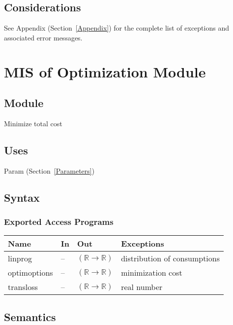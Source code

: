 \documentclass[12pt, titlepage]{article}
\begin{document}
 
 \subsection{Considerations}

See Appendix (Section~\ref{Appendix}) for the complete list of exceptions and
 associated error messages.

\newpage
\section{MIS of Optimization Module} \label{Temperature}

\subsection{Module}

Minimize total cost

\subsection{Uses}

Param (Section~\ref{Parameters})

\subsection{Syntax}

\subsubsection{Exported Access Programs}

\begin{center}
\begin{tabular}{p{3.5cm} p{1cm} p{7cm} p{2cm}}
\hline
\textbf{Name} & \textbf{In} & \textbf{Out} & \textbf{Exceptions} \\
\hline
linprog & -- & $(\mathbb{R} \rightarrow \mathbb{R})$ & distribution of consumptions \\
\hline
optimoptions& -- &  $(\mathbb{R}\rightarrow \mathbb{R})$ & minimization cost \\
\hline
transloss& -- &  $(\mathbb{R}\rightarrow \mathbb{R})$ & real number \\
\hline
\end{tabular}
\end{center}

\subsection{Semantics}
\end{document}
